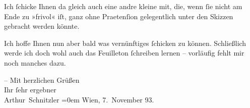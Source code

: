 \pstart
           Ich ſchicke Ihnen da gleich auch eine andre kleine \label{K_L00280-2v}\label{K_L00280-2} mit, die, wenn ſie nicht am Ende zu »frivol« iſt, ganz ohne Praetenſion
               gelegentlich unter den Skizzen gebracht werden könnte.\pend
           
\pstart
           Ich hoffe Ihnen nun aber bald was vernünftiges ſchicken {\pb}zu können. \label{LL001-1v}Schließlich werde ich doch wohl auch das Feuilleton
                  ſchreiben lernen – vorläufig fehlt mir noch manches dazu\label{LL001-1h}.\pend
           
\pstart
           – Mit herzlichen Grüßen{\\[\baselineskip]}Ihr ſehr ergebner{\\[\baselineskip]}\spacefill\mbox{Arthur Schnitzler}\pend
           \leftskip=0em{}
\pstart
           Wien, 7. November
                     93.\pend
           \endnumbering{}  
      
